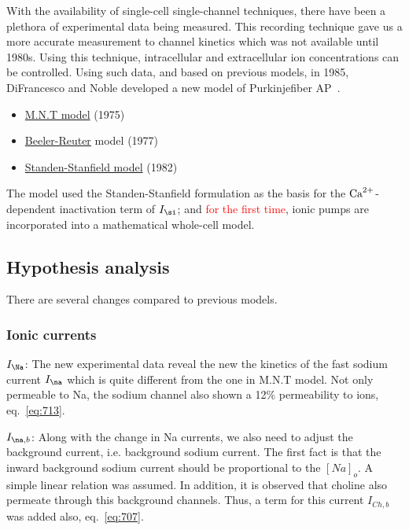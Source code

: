 With the availability of single-cell single-channel techniques, there
have been a plethora of experimental data being measured. This
recording technique gave us a more accurate measurement to channel kinetics
which was not available until 1980s. Using this technique, intracellular and
extracellular ion concentrations can be controlled.  Using such
data, and based on previous models, in 1985, DiFrancesco and Noble
developed a new model of Purkinjefiber
AP~\citep{difrancesco1985mcea}.
\begin{itemize}
\item \hyperref[sec:macall-noble-tsien]{M.N.T model} (1975)
\item \hyperref[sec:beeler-reuter-model]{Beeler-Reuter} model (1977)
\item \hyperref[sec:standen_1982model]{Standen-Stanfield model} (1982)
\end{itemize}
The model used the Standen-Stanfield formulation as the basis for the
${\text{Ca}^{2+}}$-dependent inactivation term of $I_\si$; and \textcolor{red}{for the first
time}, ionic pumps are incorporated into a mathematical whole-cell model.

\subsection{Hypothesis analysis}
\label{sec:hypothesis-analysis-1}

There are several changes compared to previous models.

\subsubsection{Ionic currents}

{\bf $I_\Na$}: The new experimental data reveal the new the kinetics of the fast
sodium current $I_\na$ which is quite different from the one in M.N.T
model. Not only permeable to Na, the sodium channel also shown a 12\%
permeability to  ions, eq.~\eqref{eq:713}.

{\bf $I_{\na,b}$}: Along with the change in Na currents, we also need to adjust
the background current, i.e. background sodium current.
The first fact is that the inward background sodium current should be
proportional to the $[Na]_o$. A simple linear relation was assumed. In addition,
it is observed that choline also permeate through this background channels.
Thus, a term for this current $I_{Ch,b}$ was added also, eq.~\eqref{eq:707}.


